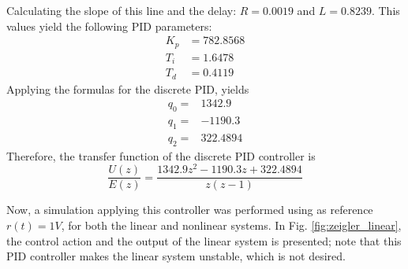 Calculating the slope of this line and the delay: $R=0.0019$ and $L=0.8239$. This values yield the following PID parameters:
\begin{equation*}
    \begin{split}
        K_p&=782.8568\\
        T_i&=1.6478\\
        T_d&=0.4119
    \end{split}
\end{equation*}
Applying the formulas for the discrete PID, yields
\begin{equation*}
    \begin{split}
        q_0=&1342.9\\
        q_1=&-1190.3\\
        q_2=&322.4894
    \end{split}
\end{equation*}
Therefore, the transfer function of the discrete PID controller is
\begin{equation}
    \dfrac{U(z)}{E(z)}=\dfrac{1342.9z^2-1190.3z+322.4894}{z(z-1)}
\end{equation}

Now, a simulation applying this controller was performed using as reference $r(t)=1V$, for both the linear and nonlinear systems. In Fig. \ref{fig:zeigler_linear}, the control action and the output of the linear system is presented; note that this PID controller makes the linear system unstable, which is not desired.

